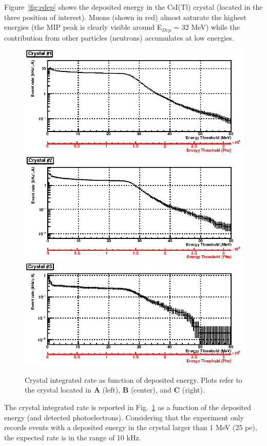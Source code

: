 Figure~\ref{fig:edep} shows the deposited energy in the CsI(Tl) crystal (located in the three  position of interest).  Muons (shown in red) almost saturate the highest energies (the MIP peak is clearly visible around E$_{Dep}$ = 32 MeV) while the contribution from other particles (neutrons) accumulates at low energies.
\begin{figure}[h!] 
\center
\includegraphics[width=12.0cm]{figs/int-rate-E1.eps} 
\includegraphics[width=12.0cm]{figs/int-rate-E2.eps} 
\includegraphics[width=12.0cm]{figs/int-rate-E3.eps}
\caption {Crystal integrated rate as function of deposited energy.
Plots refer to the crystal located in {\bf A} (left),  {\bf B} (center), and {\bf C} (right).}
\label{fig:int-rates-E}
\end{figure}

The crystal  integrated rate is reported in Fig.~\ref{fig:int-rates-E}  as a function of the deposited energy (and detected photoelectrons). Considering that  the experiment only records events 
with a deposited energy in the crystal  larger than  1 MeV (25 pe), the expected rate is in the range of 10 kHz.

